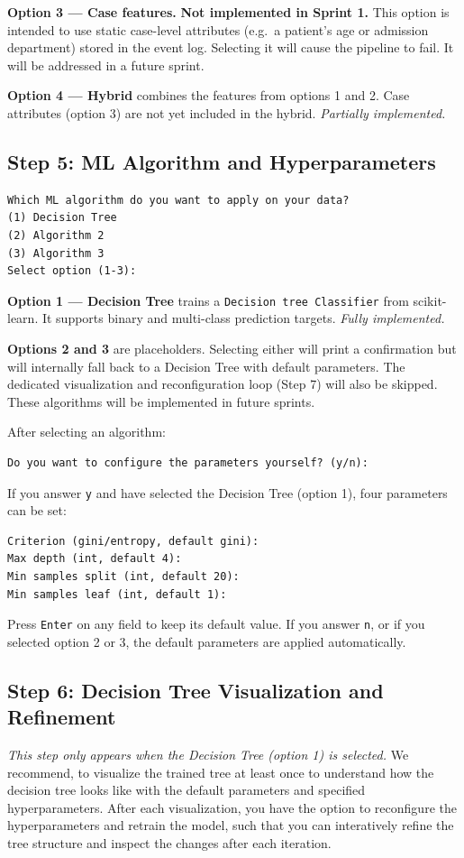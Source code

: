 \documentclass[12pt,a4paper]{article}
\begin{document}
\textbf{Option 3 --- Case features.} \textbf{Not implemented in Sprint 1.} This option is intended to use static case-level attributes (e.g.\ a patient's age or admission department) stored in the event log. Selecting it will cause the pipeline to fail. It will be addressed in a future sprint.

\textbf{Option 4 --- Hybrid} combines the features from options 1 and 2. Case attributes (option 3) are not yet included in the hybrid. \textit{Partially implemented.}

\subsection{Step 5: ML Algorithm and Hyperparameters}
\begin{verbatim}
Which ML algorithm do you want to apply on your data?
(1) Decision Tree
(2) Algorithm 2
(3) Algorithm 3
Select option (1-3):
\end{verbatim}

\textbf{Option 1 --- Decision Tree} trains a \texttt{Decision tree Classifier} from scikit-learn. It supports binary and multi-class prediction targets. \textit{Fully implemented.}

\textbf{Options 2 and 3} are placeholders. Selecting either will print a confirmation but will internally fall back to a Decision Tree with default parameters. The dedicated visualization and reconfiguration loop (Step 7) will also be skipped. These algorithms will be implemented in future sprints.

After selecting an algorithm:
\begin{verbatim}
Do you want to configure the parameters yourself? (y/n):
\end{verbatim}

If you answer \texttt{y} and have selected the Decision Tree (option 1), four parameters can be set:
\begin{verbatim}
Criterion (gini/entropy, default gini):
Max depth (int, default 4):
Min samples split (int, default 20):
Min samples leaf (int, default 1):
\end{verbatim}
Press \texttt{Enter} on any field to keep its default value. If you answer \texttt{n}, or if you selected option 2 or 3, the default parameters are applied automatically.

\subsection{Step 6: Decision Tree Visualization and Refinement}
\textit{This step only appears when the Decision Tree (option 1) is selected.} We recommend, to visualize the trained tree at least once to understand how the decision tree looks like with the default parameters and specified hyperparameters. After each visualization, you have the option to reconfigure the hyperparameters and retrain the model, such that you can interatively refine the tree structure and inspect the changes after each iteration.
\end{document}
